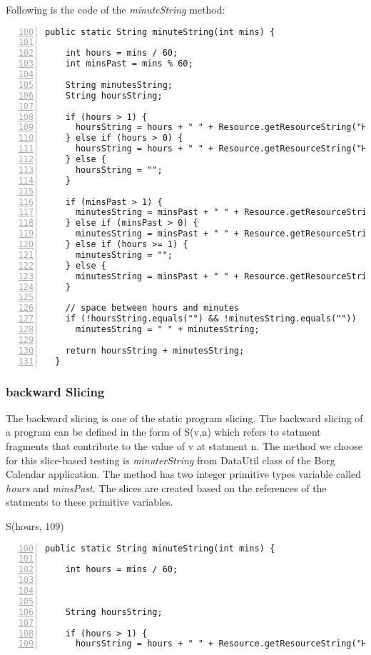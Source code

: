 \documentclass[fontsize=12pt,paper=letter,twoside]{scrartcl}
\begin{document}
\noindent Following is the code of the \emph{minuteString} method:
\begin{lstlisting}[numbers=left,firstnumber=100]
  public static String minuteString(int mins) {
    
    int hours = mins / 60;
    int minsPast = mins % 60;
    
    String minutesString;
    String hoursString;
    
    if (hours > 1) {
      hoursString = hours + " " + Resource.getResourceString("Hours");
    } else if (hours > 0) {
      hoursString = hours + " " + Resource.getResourceString("Hour");
    } else {
      hoursString = "";
    }

    if (minsPast > 1) {
      minutesString = minsPast + " " + Resource.getResourceString("Minutes");
    } else if (minsPast > 0) {
      minutesString = minsPast + " " + Resource.getResourceString("Minute");
    } else if (hours >= 1) {
      minutesString = "";
    } else {
      minutesString = minsPast + " " + Resource.getResourceString("Minutes");
    }

    // space between hours and minutes
    if (!hoursString.equals("") && !minutesString.equals(""))
      minutesString = " " + minutesString;

    return hoursString + minutesString;
  }
\end{lstlisting}

\subsubsection{backward Slicing}

The backward slicing is one of the static program slicing. The backward slicing of a program  can be defined in the form of S(v,n)  which refers to statment fragments that contribute to the value of v at statment n. The method we choose for this slice-based testing is \emph{minuterString} from DataUtil class of the Borg Calendar application. The method has two integer primitive types variable called \emph{hours} and \emph{minsPast}. The slices are created based on the references of the statments to these primitive variables.

S(hours, 109)
\begin{lstlisting}[numbers=left,firstnumber=100]
  public static String minuteString(int mins) {
    
    int hours = mins / 60;

    

    String hoursString;
    
    if (hours > 1) {
      hoursString = hours + " " + Resource.getResourceString("Hours");
\end{lstlisting}
\end{document}
